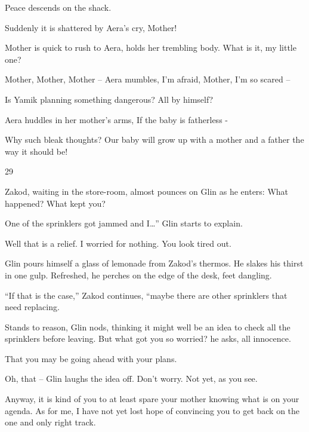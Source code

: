 \documentclass[12pt]{book}
\begin{document}
Peace descends on the shack.

Suddenly it is shattered by Aera's cry, {\textquotedbl}Mother!{\textquotedbl}

Mother is quick to rush to Aera, holds her trembling body. {\textquotedbl}What is it, my little one?{\textquotedbl}

{\textquotedbl}Mother, Mother, Mother --{\textquotedbl} Aera mumbles, {\textquotedbl}I'm afraid, Mother, I'm so scared
--{\textquotedbl}

{\textquotedbl}Is Yamik planning something dangerous? All by himself?{\textquotedbl}

Aera huddles in her mother's arms, {\textquotedbl}If the baby is fatherless -{\textquotedbl}

{\textquotedbl}Why such bleak thoughts? Our baby will grow up with a mother and a father the way it should
be!{\textquotedbl}


\bigskip

29~~

Zakod, waiting in the store-room, almost pounces on Glin as he enters: {\textquotedbl}What happened? What kept
you?{\textquotedbl}

{\textquotedbl}One of the sprinklers got jammed and I{\dots}'' Glin starts to explain.

{\textquotedbl}Well that is a relief. I worried for nothing. You look tired out.{\textquotedbl}

Glin pours himself a glass of lemonade from Zakod's thermos. He{ }slakes his
thirst in one gulp. Refreshed, he perches on the edge of the desk, feet dangling.

{}``If that is the case,'' Zakod continues, ``maybe there are other sprinklers that need replacing.{\textquotedbl}

{\textquotedbl}Stands to reason,{\textquotedbl} Glin nods, thinking it might well be an idea to check all the sprinklers
before leaving. {\textquotedbl}But what got you so worried?{\textquotedbl} he asks, all innocence.

{\textquotedbl}That you may be going ahead with your plans.{\textquotedbl}

{\textquotedbl}Oh, that -- {\textquotedbl} Glin laughs the idea off. {\textquotedbl}Don't worry. Not yet, as you
see.{\textquotedbl}

{\textquotedbl}Anyway, it is kind of you to at least spare your mother knowing what is on your agenda. As for me, I have
not yet lost hope of convincing you to get back on the one and only right track.{\textquotedbl}
\end{document}
